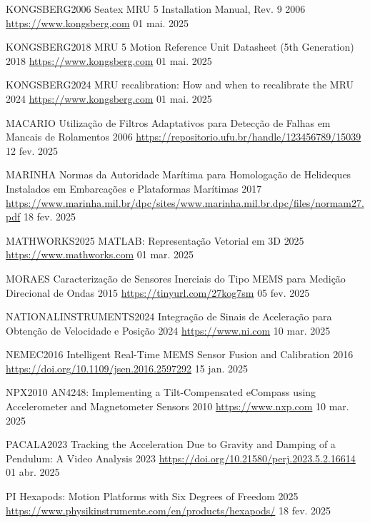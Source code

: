     {KONGSBERG2006}
    {Seatex MRU 5 Installation Manual, Rev. 9}
    {2006}
    {\url{https://www.kongsberg.com}}
    {01 mai. 2025}

    {KONGSBERG2018}
    {MRU 5 Motion Reference Unit Datasheet (5th Generation)}
    {2018}
    {\url{https://www.kongsberg.com}}
    {01 mai. 2025}

    {KONGSBERG2024}
    {MRU recalibration: How and when to recalibrate the MRU}
    {2024}
    {\url{https://www.kongsberg.com}}
    {01 mai. 2025}

    {MACARIO}
    {Utilização de Filtros Adaptativos para Detecção de Falhas em Mancais de Rolamentos}
    {2006}
    {\url{https://repositorio.ufu.br/handle/123456789/15039}}
    {12 fev. 2025}

    {MARINHA}
    {Normas da Autoridade Marítima para Homologação de Helideques Instalados em Embarcações e Plataformas Marítimas}
    {2017}
    {\url{https://www.marinha.mil.br/dpc/sites/www.marinha.mil.br.dpc/files/normam27.pdf}}
    {18 fev. 2025}

    {MATHWORKS2025}
    {MATLAB: Representação Vetorial em 3D}
    {2025}
    {\url{https://www.mathworks.com}}
    {01 mar. 2025}

    {MORAES}
    {Caracterização de Sensores Inerciais do Tipo MEMS para Medição Direcional de Ondas}
    {2015}
    {\url{https://tinyurl.com/27kog7sm}}
    {05 fev. 2025}

    {NATIONALINSTRUMENTS2024}
    {Integração de Sinais de Aceleração para Obtenção de Velocidade e Posição}
    {2024}
    {\url{https://www.ni.com}}
    {10 mar. 2025}

    {NEMEC2016}
    {Intelligent Real-Time MEMS Sensor Fusion and Calibration}
    {2016}
    {\url{https://doi.org/10.1109/jsen.2016.2597292}}
    {15 jan. 2025}

    {NPX2010}
    {AN4248: Implementing a Tilt-Compensated eCompass using Accelerometer and Magnetometer Sensors}
    {2010}
    {\url{https://www.nxp.com}}
    {10 mar. 2025}

    {PACALA2023}
    {Tracking the Acceleration Due to Gravity and Damping of a Pendulum: A Video Analysis}
    {2023}
    {\url{https://doi.org/10.21580/perj.2023.5.2.16614}}
    {01 abr. 2025}

    {PI}
    {Hexapods: Motion Platforms with Six Degrees of Freedom}
    {2025}
    {\url{https://www.physikinstrumente.com/en/products/hexapods/}}
    {18 fev. 2025}

